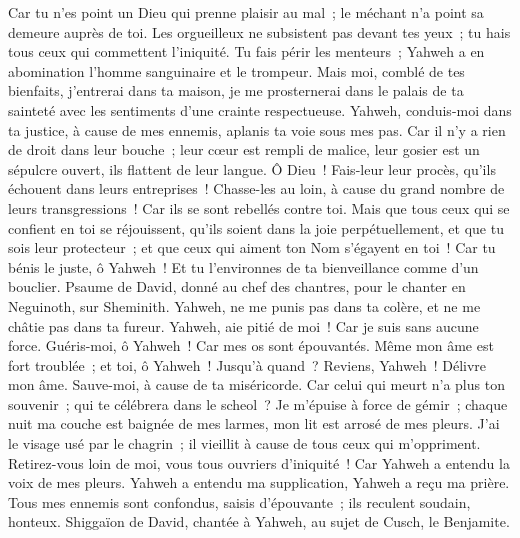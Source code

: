 \begin{multicols}{2}
Car tu n'es point un Dieu qui prenne plaisir au mal~; le méchant n'a point sa demeure auprès de toi.
Les orgueilleux ne subsistent pas devant tes yeux~; tu hais tous ceux qui commettent l'iniquité.
Tu fais périr les menteurs~; Yahweh a en abomination l'homme sanguinaire et le trompeur.
Mais moi, comblé de tes bienfaits, j'entrerai dans ta maison, je me prosternerai dans le palais de ta sainteté avec les sentiments d'une crainte respectueuse.
Yahweh, conduis-moi dans ta justice, à cause de mes ennemis, aplanis ta voie sous mes pas.
Car il n'y a rien de droit dans leur bouche~; leur cœur est rempli de malice, leur gosier est un sépulcre ouvert, ils flattent de leur langue.
Ô Dieu~! Fais-leur leur procès, qu'ils échouent dans leurs entreprises~! Chasse-les au loin, à cause du grand nombre de leurs transgressions~! Car ils se sont rebellés contre toi.
Mais que tous ceux qui se confient en toi se réjouissent, qu'ils soient dans la joie perpétuellement, et que tu sois leur protecteur~; et que ceux qui aiment ton Nom s'égayent en toi~!
Car tu bénis le juste, ô Yahweh~! Et tu l'environnes de ta bienveillance comme d'un bouclier.
\VerseOne{}Psaume de David, donné au chef des chantres, pour le chanter en Neguinoth, sur Sheminith.
Yahweh, ne me punis pas dans ta colère, et ne me châtie pas dans ta fureur.
Yahweh, aie pitié de moi~! Car je suis sans aucune force. Guéris-moi, ô Yahweh~! Car mes os sont épouvantés.
Même mon âme est fort troublée~; et toi, ô Yahweh~! Jusqu'à quand~?
Reviens, Yahweh~! Délivre mon âme. Sauve-moi, à cause de ta miséricorde.
Car celui qui meurt n'a plus ton souvenir~; qui te célébrera dans le scheol~?
Je m'épuise à force de gémir~; chaque nuit ma couche est baignée de mes larmes, mon lit est arrosé de mes pleurs.
J'ai le visage usé par le chagrin~; il vieillit à cause de tous ceux qui m'oppriment.
Retirez-vous loin de moi, vous tous ouvriers d'iniquité~! Car Yahweh a entendu la voix de mes pleurs.
Yahweh a entendu ma supplication, Yahweh a reçu ma prière.
Tous mes ennemis sont confondus, saisis d'épouvante~; ils reculent soudain, honteux.
\VerseOne{}Shiggaïon de David, chantée à Yahweh, au sujet de Cusch, le Benjamite.

\end{multicols}
